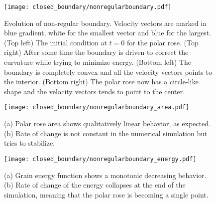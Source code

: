 \begin{figure}[t]
    \centering
    \texttt{[image: closed\_boundary/nonregularboundary.pdf]}
    \caption[Non-regular boundary evolution]{Evolution of non-regular boundary. Velocity vectors are marked in blue gradient, white for the smallest vector and blue for the largest.
    (Top left) The initial condition at $t=0$ for the polar rose. (Top right) After some time the boundary is driven to correct the curvature while trying to minimize energy. (Bottom left) The boundary is completely convex and all the velocity vectors points to the interior. (Bottom right) The polar rose now has a circle-like shape and the velocity vectors tends to point to the center.}
    \label{fig:nonregularboundary}
\end{figure}



\begin{figure}[t]
    \centering
    \texttt{[image: closed\_boundary/nonregularboundary\_area.pdf]}
    \subfloat[\label{fig:noncircarea}]{\hspace{.55\linewidth}}
    \subfloat[\label{fig:noncircdAdt}]{\hspace{.45\linewidth}}
    \caption[Non-regular boundary area and rate of change]{(a) Polar rose area shows qualitatively linear behavior, as expected. (b) Rate of change is not constant in the numerical simulation but tries to stabilize.}
    \label{fig:nonregularboundary_area}
\end{figure}

\begin{figure}[t]
    \centering
    \texttt{[image: closed\_boundary/nonregularboundary\_energy.pdf]}
    \subfloat[\label{fig:noncircenergy}]{\hspace{.55\linewidth}}
    \subfloat[\label{fig:noncircdEdt}]{\hspace{.45\linewidth}}
    \caption[Non-regular boundary energy and rate of change]{(a) Grain energy function shows a monotonic decreasing behavior. (b) Rate of change of the energy collapses at the end of the simulation, meaning that the polar rose is becoming a single point.}
    \label{fig:nonregularboundary_energy}
\end{figure}

